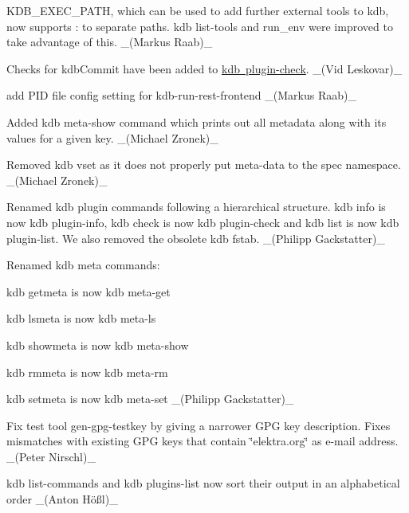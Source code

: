 \begin{DoxyItemize}
\item {\ttfamily K\+D\+B\+\_\+\+E\+X\+E\+C\+\_\+\+P\+A\+TH}, which can be used to add further external tools to {\ttfamily kdb}, now supports {\ttfamily \+:} to separate paths. {\ttfamily kdb list-\/tools} and {\ttfamily run\+\_\+env} were improved to take advantage of this. \+\_\+(\+Markus Raab)\+\_\+
\item Checks for {\ttfamily kdb\+Commit} have been added to \mbox{\hyperlink{doc_help_kdb-plugin-check_md}{kdb plugin-\/check}}. \+\_\+(\+Vid Leskovar)\+\_\+
\item add P\+ID file config setting for kdb-\/run-\/rest-\/frontend \+\_\+(\+Markus Raab)\+\_\+
\item Added {\ttfamily kdb meta-\/show} command which prints out all metadata along with its values for a given key. \+\_\+(\+Michael Zronek)\+\_\+
\item Removed {\ttfamily kdb vset} as it does not properly put meta-\/data to the spec namespace. \+\_\+(\+Michael Zronek)\+\_\+
\item Renamed kdb plugin commands following a hierarchical structure. {\ttfamily kdb info} is now {\ttfamily kdb plugin-\/info}, {\ttfamily kdb check} is now {\ttfamily kdb plugin-\/check} and {\ttfamily kdb list} is now {\ttfamily kdb plugin-\/list}. We also removed the obsolete {\ttfamily kdb fstab}. \+\_\+(\+Philipp Gackstatter)\+\_\+
\item Renamed kdb meta commands\+:
\begin{DoxyItemize}
\item {\ttfamily kdb getmeta} is now {\ttfamily kdb meta-\/get}
\item {\ttfamily kdb lsmeta} is now {\ttfamily kdb meta-\/ls}
\item {\ttfamily kdb showmeta} is now {\ttfamily kdb meta-\/show}
\item {\ttfamily kdb rmmeta} is now {\ttfamily kdb meta-\/rm}
\item {\ttfamily kdb setmeta} is now {\ttfamily kdb meta-\/set} \+\_\+(\+Philipp Gackstatter)\+\_\+
\end{DoxyItemize}
\item Fix test tool {\ttfamily gen-\/gpg-\/testkey} by giving a narrower G\+PG key description. Fixes mismatches with existing G\+PG keys that contain \char`\"{}elektra.\+org\char`\"{} as e-\/mail address. \+\_\+(\+Peter Nirschl)\+\_\+
\item {\ttfamily kdb list-\/commands} and {\ttfamily kdb plugins-\/list} now sort their output in an alphabetical order \+\_\+(Anton Hößl)\+\_\+

\end{DoxyItemize}
